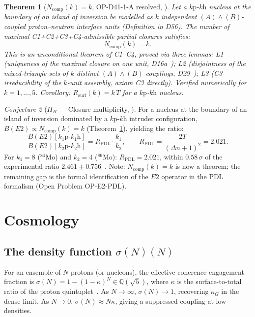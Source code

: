 \documentclass[11pt,a4paper]{article}
\theoremstyle{plain}
\newtheorem{theorem}{Theorem}[section]
\theoremstyle{definition}
\theoremstyle{remark}
\newtheorem{conjecture}[theorem]{Conjecture}
\newcommand{\sigmaN}{\sigma(N)}
\begin{document}
\begin{theorem}[$N_{\mathrm{comp}}(k)=k$, OP-D41-1-A resolved, \cite{D56}]
\label{thm:Ncomp}
Let a $k\mathrm{p}$-$k\mathrm{h}$ nucleus at the boundary of an island of inversion be modelled as $k$ independent $(A)\wedge(B)$-coupled proton--neutron interface units (Definition in D56). The number of maximal C1+C2+C3+C4-admissible partial closures satisfies:
\begin{equation}
  N_{\mathrm{comp}}(k) = k.
\end{equation}
This is an unconditional theorem of C1--C4, proved via three lemmas: \emph{L1} (uniqueness of the maximal closure on one unit, D16a~\cite{D16a}); \emph{L2} (disjointness of the mixed-triangle sets of $k$ distinct $(A)\wedge(B)$ couplings, D29~\cite{D29}); \emph{L3} (C3-irreducibility of the $k$-unit assembly, axiom C3 directly). Verified numerically for $k=1,\ldots,5$. Corollary: $R_{\mathrm{surf}}(k)=k\,T$ for a $k\mathrm{p}$-$k\mathrm{h}$ nucleus.
\end{theorem}

\begin{conjecture}[$H_B$ --- Closure multiplicity, \cite{D41}]
\label{conj:HB}
For a nucleus at the boundary of an island of inversion dominated by a $k\mathrm{p}$-$k\mathrm{h}$ intruder configuration, $B(E2)\propto N_{\mathrm{comp}}(k)=k$ (Theorem~\ref{thm:Ncomp}), yielding the ratio:
\begin{equation}
  \frac{B(E2)[k_1\mathrm{p}\text{-}k_1\mathrm{h}]}{B(E2)[k_2\mathrm{p}\text{-}k_2\mathrm{h}]}
  = R_{\mathrm{PDL}}\cdot\frac{k_1}{k_2},
  \qquad R_{\mathrm{PDL}} = \frac{2T}{(\Delta n+1)^2} = 2.021.
\end{equation}
For $k_1=8$ ($^{84}$Mo) and $k_2=4$ ($^{86}$Mo): $R_{\mathrm{PDL}}=2.021$, within $0.58\,\sigma$ of the experimental ratio $2.461\pm0.756$~\cite{Ha2025}. Note: $N_{\mathrm{comp}}(k)=k$ is now a theorem; the remaining gap is the formal identification of the $E2$ operator in the PDL formalism (Open Problem OP-E2-PDL).
\end{conjecture}

\section{Cosmology}
\label{sec:cosmology}

\subsection{The density function \texorpdfstring{$\sigmaN(N)$}{sigmaN(N)}}
\label{subsec:sigma}
For an ensemble of $N$ protons (or nucleons), the effective coherence engagement fraction is $\sigmaN=1-(1-\kappa)^N\in\mathbb{Q}(\sqrt{5})$, where $\kappa$ is the surface-to-total ratio of the proton quintuplet~\cite{D24,D26}. As $N\to\infty$, $\sigmaN\to 1$, recovering $\kappa_G$ in the dense limit. As $N\to0$, $\sigmaN\approx N\kappa$, giving a suppressed coupling at low densities.
\end{document}
